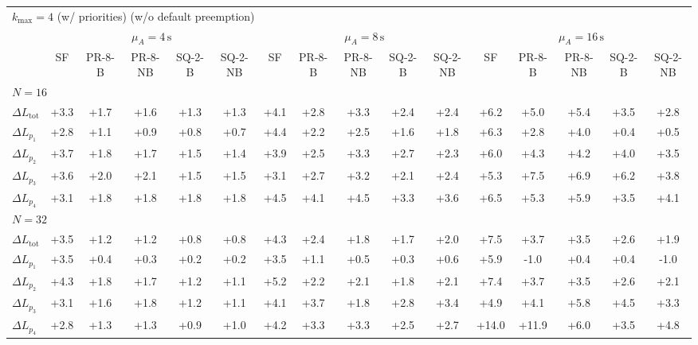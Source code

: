 \begin{tabular}{l c c c c c c c c c c c c c c c}
\toprule
\multicolumn{16}{l}{$k_{\max}=4$ (w/ priorities) (w/o default preemption)} \\
\addlinespace[0.2em]
 & \multicolumn{5}{c}{$\mu_A=4\,\mathrm{s}$} & \multicolumn{5}{c}{$\mu_A=8\,\mathrm{s}$} & \multicolumn{5}{c}{$\mu_A=16\,\mathrm{s}$} \\
\cmidrule(lr){2-6}\cmidrule(lr){7-11}\cmidrule(lr){12-16}
 & SF & PR-8-B & PR-8-NB & SQ-2-B & SQ-2-NB & SF & PR-8-B & PR-8-NB & SQ-2-B & SQ-2-NB & SF & PR-8-B & PR-8-NB & SQ-2-B & SQ-2-NB \\
\midrule
\multicolumn{16}{l}{${N=16}$} \\
\midrule
$\Delta L_{\mathrm{tot}}$ & +3.3 & +1.7 & +1.6 & +1.3 & +1.3 & +4.1 & +2.8 & +3.3 & +2.4 & +2.4 & +6.2 & +5.0 & +5.4 & +3.5 & +2.8 \\
$\Delta L_{p_1}$ & +2.8 & +1.1 & +0.9 & +0.8 & +0.7 & +4.4 & +2.2 & +2.5 & +1.6 & +1.8 & +6.3 & +2.8 & +4.0 & +0.4 & +0.5 \\
$\Delta L_{p_2}$ & +3.7 & +1.8 & +1.7 & +1.5 & +1.4 & +3.9 & +2.5 & +3.3 & +2.7 & +2.3 & +6.0 & +4.3 & +4.2 & +4.0 & +3.5 \\
$\Delta L_{p_3}$ & +3.6 & +2.0 & +2.1 & +1.5 & +1.5 & +3.1 & +2.7 & +3.2 & +2.1 & +2.4 & +5.3 & +7.5 & +6.9 & +6.2 & +3.8 \\
$\Delta L_{p_4}$ & +3.1 & +1.8 & +1.8 & +1.8 & +1.8 & +4.5 & +4.1 & +4.5 & +3.3 & +3.6 & +6.5 & +5.3 & +5.9 & +3.5 & +4.1 \\
\midrule
\multicolumn{16}{l}{${N=32}$} \\
\midrule
$\Delta L_{\mathrm{tot}}$ & +3.5 & +1.2 & +1.2 & +0.8 & +0.8 & +4.3 & +2.4 & +1.8 & +1.7 & +2.0 & +7.5 & +3.7 & +3.5 & +2.6 & +1.9 \\
$\Delta L_{p_1}$ & +3.5 & +0.4 & +0.3 & +0.2 & +0.2 & +3.5 & +1.1 & +0.5 & +0.3 & +0.6 & +5.9 & -1.0 & +0.4 & +0.4 & -1.0 \\
$\Delta L_{p_2}$ & +4.3 & +1.8 & +1.7 & +1.2 & +1.1 & +5.2 & +2.2 & +2.1 & +1.8 & +2.1 & +7.4 & +3.7 & +3.5 & +2.6 & +2.1 \\
$\Delta L_{p_3}$ & +3.1 & +1.6 & +1.8 & +1.2 & +1.1 & +4.1 & +3.7 & +1.8 & +2.8 & +3.4 & +4.9 & +4.1 & +5.8 & +4.5 & +3.3 \\
$\Delta L_{p_4}$ & +2.8 & +1.3 & +1.3 & +0.9 & +1.0 & +4.2 & +3.3 & +3.3 & +2.5 & +2.7 & +14.0 & +11.9 & +6.0 & +3.5 & +4.8 \\
\bottomrule
\end{tabular}
